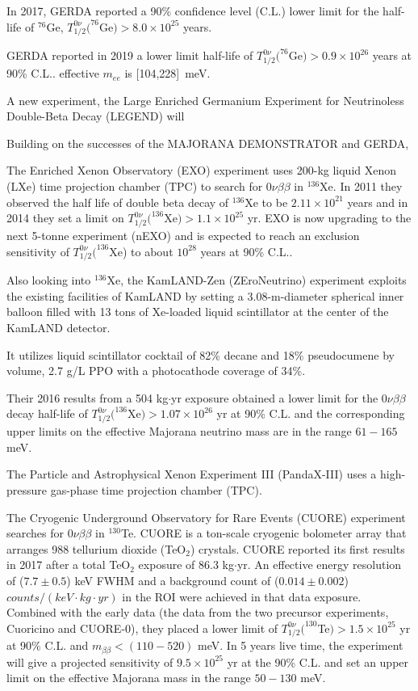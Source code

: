 In 2017, GERDA reported a 90\% confidence level (C.L.) lower limit for the half-life of $^{76}$Ge, $T^{0\nu}_{1/2}(^{76}$Ge$)>8.0\times 10^{25}$ years.

GERDA reported in 2019 a lower limit half-life of $T^{0\nu}_{1/2}(^{76}$Ge$)>0.9\times 10^{26}$ years at 90\% C.L.\cite{agostini2019probing}. effective $m_{ee}$ is [104,228]~meV.

A new experiment, the Large Enriched Germanium Experiment for Neutrinoless Double-Beta Decay (LEGEND) will 



Building on the successes of the MAJORANA DEMONSTRATOR and GERDA,




The Enriched Xenon Observatory (EXO) experiment uses 200-kg liquid Xenon (LXe) time projection chamber (TPC) to search for $0\nu\beta\beta$ in $^{136}$Xe. In 2011 they observed the half life of double beta decay of $^{136}$Xe to be $2.11\times 10^{21}$ years and in 2014 they set a limit on $T^{0\nu}_{1/2}(^{136}$Xe$)>1.1\times 10^{25}$ yr\cite{albert2014search}. EXO is now upgrading to the next 5-tonne experiment (nEXO) and is expected to reach an exclusion sensitivity of $T^{0\nu}_{1/2}(^{136}$Xe) to about $10^{28}$ years at 90\% C.L.\cite{albert2018sensitivity}.

Also looking into $^{136}$Xe, the KamLAND-Zen (ZEroNeutrino) experiment exploits the existing facilities of KamLAND by setting a 3.08-m-diameter spherical inner balloon filled with 13 tons of Xe-loaded liquid scintillator at the center of the KamLAND detector.

It utilizes liquid scintillator cocktail of 82\% decane and 18\% pseudocumene by volume, 2.7 g/L PPO with a photocathode coverage of 34\%.

Their 2016 results from a 504 kg$\cdot$yr exposure obtained a lower limit for the $0\nu\beta\beta$ decay half-life of $T^{0\nu}_{1/2}(^{136}$Xe$)>1.07\times 10^{26}$ yr at 90\% C.L. and the corresponding upper limits on the effective Majorana neutrino mass are in the range $61-165$ meV\cite{gando2016search}.

The Particle and Astrophysical Xenon Experiment III (PandaX-III) uses a high-pressure gas-phase time projection chamber (TPC).

The Cryogenic Underground Observatory for Rare Events (CUORE) experiment searches for $0\nu\beta\beta$ in $^{130}$Te. CUORE is a ton-scale cryogenic bolometer array that arranges 988 tellurium dioxide (TeO$_2$) crystals. CUORE reported its first results in 2017 after a total TeO$_2$ exposure of 86.3 kg$\cdot$yr. An effective energy resolution of ($7.7\pm 0.5$) keV FWHM and a background count of ($0.014\pm0.002$) $counts/(keV\cdot kg\cdot yr)$ in the ROI were achieved in that data exposure. Combined with the early data (the data from the two precursor experiments, Cuoricino and CUORE-0), they placed a lower limit of $T^{0\nu}_{1/2}(^{130}$Te$)>1.5\times 10^{25}$ yr at 90\% C.L. and $m_{\beta\beta}<(110-520)$ meV\cite{alduino2018first}. In 5 years live time, the experiment will give a projected sensitivity of $9.5\times 10^{25}$ yr at the 90\% C.L. and set an upper limit on the effective Majorana mass in the range $50-130$ meV\cite{piperno2015dark}.

